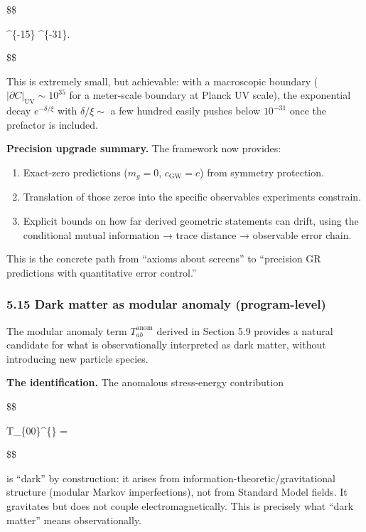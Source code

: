 \documentclass[11pt,a4paper]{article}
\theoremstyle{remark}
\providecommand{\tightlist}{%
  \setlength{\itemsep}{0pt}\setlength{\parskip}{0pt}}
\begin{document}
\$\$

\delta {}\^{}\{-15\}
\quad \Rightarrow \quad
\varepsilon \lesssim {}  \^{}\{-31\}.

\$\$

This is extremely small, but achievable: with a macroscopic boundary
(\(|\partial C|_{\mathrm{UV}} \sim 10^{35}\) for a meter-scale boundary at Planck UV
scale), the exponential decay \(e^{-\delta/\xi}\) with \(\delta/\xi \sim\) a few
hundred easily pushes below \(10^{-31}\) once the prefactor is included.

\textbf{Precision upgrade summary.} The framework now provides:

\begin{enumerate}
\def\labelenumi{\arabic{enumi}.}
\tightlist
\item
  Exact-zero predictions (\(m_g = 0\), \(c_{\mathrm{GW}} = c\)) from symmetry
  protection.
\item
  Translation of those zeros into the specific observables experiments
  constrain.
\item
  Explicit bounds on how far derived geometric statements can drift, using
  the conditional mutual information → trace distance → observable
  error chain.
\end{enumerate}

This is the concrete path from ``axioms about screens'' to ``precision GR
predictions with quantitative error control.''

\subsubsection{5.15 Dark matter as modular anomaly (program-level)}\label{dark-matter-as-modular-anomaly-program-level}

The modular anomaly term \(T_{ab}^{\mathrm{anom}}\) derived in Section 5.9 provides
a natural candidate for what is observationally interpreted as dark matter,
without introducing new particle species.

\textbf{The identification.} The anomalous stress-energy contribution

\$\$

\langle T\_\{00\}\^{}\{\} \rangle
=  \cdot {}

\$\$

is ``dark'' by construction: it arises from information-theoretic/gravitational
structure (modular Markov imperfections), not from Standard Model fields. It
gravitates but does not couple electromagnetically. This is precisely what
``dark matter'' means observationally.
\end{document}
